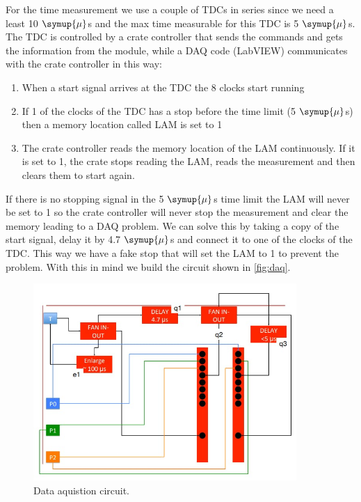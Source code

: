 For the time measurement we use a couple of TDCs in series since we need a least 10$\;\symup{\mu}$s
and the max time measurable for this TDC is 5$\;\symup{\mu}$s.
The TDC is controlled by a crate controller that sends the commands and gets the information
from the module, while a DAQ code (LabVIEW) communicates with the crate controller
in this way:
\begin{enumerate}
  \item When a start signal arrives at the TDC the 8 clocks start running
  \item If 1 of the clocks of the TDC has a stop before the time limit (5$\;\symup{\mu}$s) then a memory location called LAM is set to 1
  \item The crate controller reads the memory location of the LAM continuously. If it is set to 
   1, the crate stops reading the LAM, reads the measurement and then clears them to start again.
\end{enumerate}
If there is no stopping signal in the 5$\;\symup{\mu}$s time limit the LAM will never be set
to 1 so the crate controller will never stop the measurement and clear the memory leading to a 
DAQ problem. We can solve this by taking a copy of the start signal, delay
it by 4.7$\;\symup{\mu}$s and connect it to one of the clocks of the TDC. This way we have
a fake stop that will set the LAM to 1 to prevent the problem.
With this in mind we build the circuit shown in \autoref{fig:daq}.\\
\begin{figure}[h]
\begin{center}
\includegraphics[width=100mm]{figures/cattura4.png}
\end{center}
\caption{Data aquistion circuit.}
\label{fig:daq}
\end{figure}

